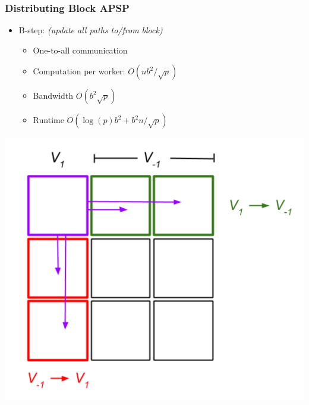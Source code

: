 \documentclass{beamer}
\begin{document}
\begin{frame}
\frametitle{Distributing Block APSP}
\begin{itemize}
\item B-step: \emph{(update all paths to/from block)}
\begin{itemize}
\item One-to-all communication
\item Computation per worker: $O(nb^2/\sqrt{p})$
\item Bandwidth $O(b^2 \sqrt{p})$
\item Runtime $O(\log(p)b^2 + b^2n/\sqrt{p})$
\end{itemize}
\end{itemize}
\begin{center}
\includegraphics[scale = 0.3]{blockApsp-3.png}
\end{center}
\end{frame}
\end{document}
